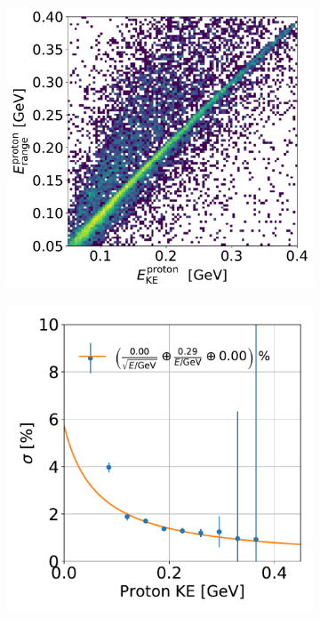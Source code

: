 \documentclass[a4paper]{article}
\begin{document}
\begin{figure}[H]
\begin{center}
\begin{subfigure}[b]{0.38\textwidth}
    \end{subfigure}
    \begin{subfigure}[b]{0.4\textwidth}
    \centering
    \includegraphics[width=1.00\textwidth]{ereco/proton_eres2D.pdf}
    \end{subfigure}
    \begin{subfigure}[b]{0.38\textwidth}
    \centering
    \includegraphics[width=1.00\textwidth]{ereco/proton_eres_vs_true.pdf}

\end{subfigure}
\end{center}
\end{figure}
\end{document}
